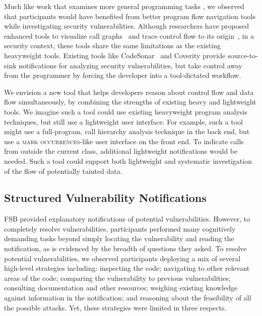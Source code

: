 \documentclass{sig-alternate}
\begin{document}
Much like work that examines more general programming tasks \cite{latoza2010hard}, we observed that participants would have benefited from better program flow navigation tools while investigating security vulnerabilities.
Although researchers have proposed enhanced tools to visualize call graphs~\cite{latoza2011visualizing} and trace control flow to its origin~\cite{barnett2014getMeHere},
in a security context, these tools share the same limitations as the existing heavyweight tools.
Existing tools like CodeSonar~\cite{CodeSonar} and Coverity provide source-to-sink notifications for analyzing security
vulnerabilities, but take control away from the programmer by forcing the developer into a tool-dictated
workflow.


We envision a new tool that helps developers reason about control flow and data flow simultaneously,
by combining the strengths of existing heavy and lightweight tools.
We imagine such a tool could use existing heavyweight program analysis techniques, but still
use a lightweight user interface.
For example, such a tool might use a full-program, call hierarchy analysis technique in the back end,
but use a \textsc{mark occurrences}-like user interface on the front end.
To indicate calls from outside the current class, additional lightweight notifications would be needed.
Such a tool could support both lightweight and systematic investigation of the flow of 
potentially tainted data.




\subsection{Structured Vulnerability Notifications}
\label{structuredNotifications}
FSB provided explanatory notifications of potential vulnerabilities.
However, to completely resolve vulnerabilities,
participants performed many cognitively demanding tasks beyond simply locating the vulnerability and reading the notification, 
as is evidenced by the breadth of questions they asked. 
To resolve potential vulnerabilities, we observed participants deploying a mix of several high-level strategies including: 
inspecting the code;
navigating to other relevant areas of the code; 
comparing the vulnerability to previous vulnerabilities; 
consulting documentation and other resources; 
weighing existing knowledge against information in the notification; 
and reasoning about the feasibility of all the possible attacks. 
Yet, these strategies were limited in three respects.
\end{document}
